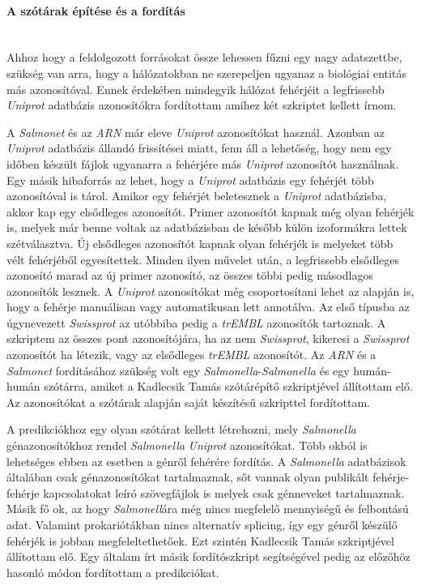 \documentclass[a4paper,12pt]{article}
\begin{document}
			\paragraph{A szótárak építése és a fordítás} \mbox{}\\
			Ahhoz hogy a feldolgozott forrásokat össze lehessen fűzni egy nagy adatszettbe, szükség van arra, hogy a hálózatokban ne szerepeljen ugyanaz a biológiai entitás más azonosítóval. Ennek érdekében mindegyik hálózat fehérjéit a legfrissebb \textit{Uniprot} adatbázis azonosítókra fordítottam amihez két szkriptet kellett írnom. 
			
			A \textit{Salmonet} és az \textit{ARN} már eleve \textit{Uniprot} azonosítókat használ. Azonban az \textit{Uniprot} adatbázis állandó frissítései miatt, fenn áll a lehetőség, hogy nem egy időben készült fájlok ugyanarra a fehérjére más \textit{Uniprot} azonosítót használnak. Egy másik hibaforrás az lehet, hogy a \textit{Uniprot} adatbázis egy fehérjét több azonosítóval is tárol. Amikor egy fehérjét beletesznek a \textit{Uniprot} adatbázisba, akkor kap egy elsődleges azonosítót. Primer azonosítót kapnak még olyan fehérjék is, melyek már benne voltak az adatbázisban de később külön izoformákra lettek szétválasztva. Új elsődleges azonosítót kapnak olyan fehérjék is melyeket több vélt fehérjéből egyesítettek. Minden ilyen művelet után, a legfrissebb elsődleges azonosító marad az új primer azonosító, az összes többi pedig másodlagos azonosítók lesznek. A \textit{Uniprot} azonosítókat még csoportosítani lehet az alapján is, hogy a fehérje manuálisan vagy automatikusan lett annotálva. Az első típusba az úgynevezett \textit{Swissprot} az utóbbiba pedig a \textit{trEMBL} azonosítók tartoznak. A szkriptem az összes pont azonosítójára, ha az nem \textit{Swissprot}, kikeresi a \textit{Swissprot} azonosítót ha létezik, vagy az elsődleges \textit{trEMBL} azonosítót. Az \textit{ARN} és a \textit{Salmonet} fordításához szükség volt egy \textit{Salmonella}-\textit{Salmonella} és egy humán-humán szótárra, amiket a Kadlecsik Tamás szótárépítő szkriptjével állítottam elő. Az azonosítókat a szótárak alapján saját készítésű szkripttel fordítottam.
			
			A predikciókhoz egy olyan szótárat kellett létrehozni, mely \textit{Salmonella} génazonosítókhoz rendel \textit{Salmonella} \textit{Uniprot} azonosítókat. Több okból is lehetséges ebben az esetben a génről fehérére fordítás. A \textit{Salmonella} adatbázisok általában csak génazonosítókat tartalmaznak, sőt vannak olyan publikált fehérje-fehérje kapcsolatokat leíró szövegfájlok is melyek csak génneveket tartalmaznak. Másik fő ok, az hogy \textit{Salmonell}ára még nincs megfelelő mennyiségű és felbontású adat. Valamint prokariótákban nincs alternatív splicing, így egy génről készülő fehérjék is jobban megfeleltethetőek. Ezt szintén Kadlecsik Tamás szkriptjével állítottam elő. Egy általam írt másik fordítószkript segítségével pedig az előzőhöz hasonló módon fordítottam a predikciókat.
			
\end{document}
